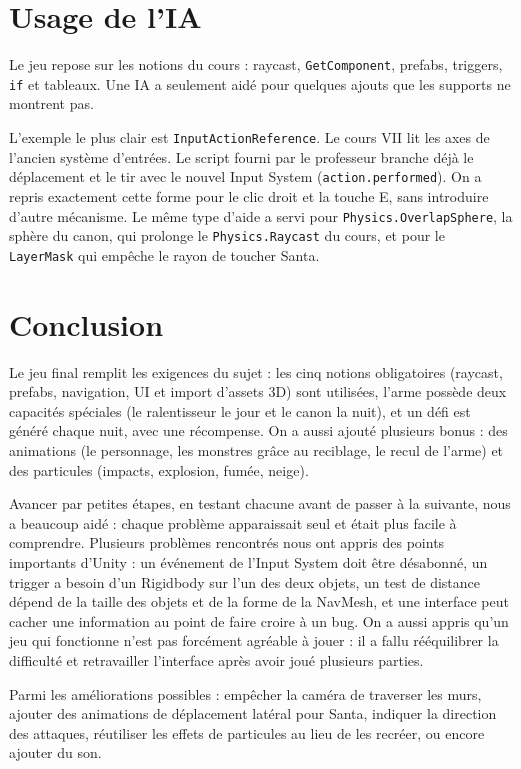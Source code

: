 \documentclass[11pt,a4paper]{article}
\begin{document}
\section{Usage de l'IA}

Le jeu repose sur les notions du cours : raycast, \texttt{GetComponent}, prefabs, triggers, \texttt{if} et tableaux. Une IA a seulement aidé pour quelques ajouts que les supports ne montrent pas.

L'exemple le plus clair est \texttt{InputActionReference}. Le cours VII lit les axes de l'ancien système d'entrées. Le script fourni par le professeur branche déjà le déplacement et le tir avec le nouvel Input System (\texttt{action.performed}). On a repris exactement cette forme pour le clic droit et la touche E, sans introduire d'autre mécanisme. Le même type d'aide a servi pour \texttt{Physics.OverlapSphere}, la sphère du canon, qui prolonge le \texttt{Physics.Raycast} du cours, et pour le \texttt{LayerMask} qui empêche le rayon de toucher Santa.

\section{Conclusion}
Le jeu final remplit les exigences du sujet : les cinq notions obligatoires (raycast, prefabs, navigation, UI et import d'assets 3D) sont utilisées, l'arme possède deux capacités spéciales (le ralentisseur le jour et le canon la nuit), et un défi est généré chaque nuit, avec une récompense. On a aussi ajouté plusieurs bonus : des animations (le personnage, les monstres grâce au reciblage, le recul de l'arme) et des particules (impacts, explosion, fumée, neige).

Avancer par petites étapes, en testant chacune avant de passer à la suivante, nous a beaucoup aidé : chaque problème apparaissait seul et était plus facile à comprendre. Plusieurs problèmes rencontrés nous ont appris des points importants d'Unity : un événement de l'Input System doit être désabonné, un trigger a besoin d'un Rigidbody sur l'un des deux objets, un test de distance dépend de la taille des objets et de la forme de la NavMesh, et une interface peut cacher une information au point de faire croire à un bug. On a aussi appris qu'un jeu qui fonctionne n'est pas forcément agréable à jouer : il a fallu rééquilibrer la difficulté et retravailler l'interface après avoir joué plusieurs parties.

Parmi les améliorations possibles : empêcher la caméra de traverser les murs, ajouter des animations de déplacement latéral pour Santa, indiquer la direction des attaques, réutiliser les effets de particules au lieu de les recréer, ou encore ajouter du son.
\end{document}
